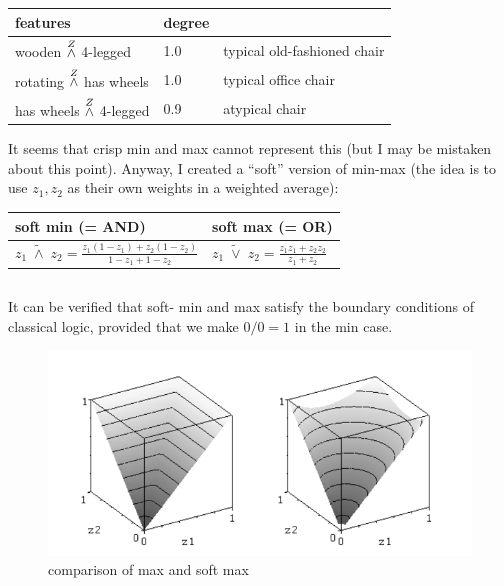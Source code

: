 \hspace*{1cm} \begin{tabular}{|l|l|l|} \hline
\textbf{features}            & \textbf{degree} &\\ \hline
wooden $\stackrel{Z}{\wedge}$ 4-legged     & 1.0             & typical old-fashioned chair\\
rotating $\stackrel{Z}{\wedge}$ has wheels & 1.0             & typical office chair\\
has wheels $\stackrel{Z}{\wedge}$ 4-legged & 0.9             & atypical chair\\
\hline
\end{tabular}

It seems that crisp min and max cannot represent this (but I may be mistaken about this point).  Anyway, I created a ``soft'' version of min-max (the idea is to use $z_1, z_2$ as their own weights in a weighted average):

\hspace*{1cm} \begin{tabular}{|l|l|}
\hline
{\textbf{soft min (= AND)}} & {\textbf{soft max (= OR)}}\\ \hline
\rule[-7mm]{0mm}{16mm} 
$\displaystyle z_1 \; \widetilde{\wedge} \; z_2 = \frac{z_1 (1-z_1) + z_2 (1-z_2)}{1 - z_1 + 1 - z_2} $
& $\displaystyle z_1 \; \widetilde{\vee} \; z_2 = \frac{z_1 z_1 + z_2 z_2}{z_1 + z_2} $ \\
\hline
\end{tabular}
\parbox{4cm}{\begin{equation}
\label{eqn:soft-min-max}
\end{equation}}

It can be verified that soft- min and max satisfy the boundary conditions of classical logic, provided that we make $0/0 = 1$ in the min case.

\begin{figure}[H]
\centering
\includegraphics[scale=0.9]{soft-max.png}
\caption{comparison of max and soft max}
\end{figure}

